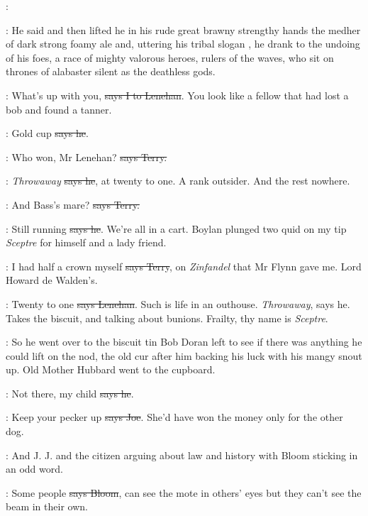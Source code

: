 \lenehan:

:
He said and then lifted he
in his rude great brawny strengthy hands
the medher of dark strong foamy ale and, uttering his tribal slogan , he drank to the undoing of his foes, a race of mighty valorous
heroes, rulers of the waves, who sit on thrones of alabaster silent as the
deathless gods.

:
What's up with you, \sout{says I to Lenehan}.
You look like a fellow that had
lost a bob and found a tanner.

\lenehan:
Gold cup \sout{says he}.

\terry:
Who won, Mr Lenehan? \sout{says Terry.}

\lenehan:
\emph{Throwaway} \sout{says he}, at twenty to one.
A rank outsider. And the rest
nowhere.%

\terry:
And Bass's mare? \sout{says Terry.}

\lenehan:
Still running \sout{says he}.
We're all in a cart. Boylan plunged two quid on
my tip \emph{Sceptre} for himself and a lady friend.

\terry:
I had half a crown myself \sout{says Terry},
on \emph{Zinfandel} that Mr Flynn gave
me. Lord Howard de Walden's.

\lenehan:
Twenty to one \sout{says Lenehan}.
Such is life in an outhouse. \emph{Throwaway},
says he. Takes the biscuit, and talking about bunions. Frailty, thy name
is \emph{Sceptre}.

\Nq:
So he went over to the biscuit tin Bob Doran left to see if there was
anything he could lift on the nod,
the old cur after him backing his luck
with his mangy snout up. Old Mother Hubbard went to the cupboard.

\lenehan:
Not there, my child \sout{says he}.

\joe:
Keep your pecker up \sout{says Joe}.
She'd have won the money only for the
other dog.

\Nq:
And J. J. and the citizen arguing about law and history with Bloom
sticking in an odd word.

\Bloom:
Some people \sout{says Bloom},
can see the mote in others' eyes but they can't
see the beam in their own.

